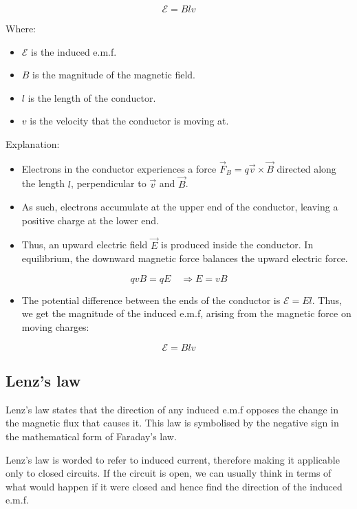 \documentclass[11pt]{article}
\begin{document}
\[\mathcal{E} = Blv\]

Where:
\begin{itemize}
\item \(\mathcal{E}\) is the induced e.m.f.
\item \(B\) is the magnitude of the magnetic field.
\item \(l\) is the length of the conductor.
\item \(v\) is the velocity that the conductor is moving at.
\end{itemize}
Explanation:
\begin{itemize}
\item Electrons in the conductor experiences a force \(\vec{F}_B = q \vec{v} \times \vec{B}\) directed along the length \(l\), perpendicular to \(\vec{v}\) and \(\vec{B}\).
\item As such, electrons accumulate at the upper end of the conductor, leaving a positive charge at the lower end.
\item Thus, an upward electric field \(\vec{E}\) is produced inside the conductor. In equilibrium, the downward magnetic force balances the upward electric force.
\end{itemize}
\[qvB = qE \quad \Rightarrow E = vB\]
\begin{itemize}
\item The potential difference between the ends of the conductor is \(\mathcal{E} = El\). Thus, we get the magnitude of the induced e.m.f, arising from the magnetic force on moving charges:
\end{itemize}
\[\mathcal{E} = Blv\]

\newpage
\subsection{Lenz's law}
\label{sec:org23fc8e2}
Lenz's law states that the direction of any induced e.m.f opposes the change in the magnetic flux that causes it. This law is symbolised by the negative sign in the mathematical form of Faraday's law.


Lenz's law is worded to refer to induced current, therefore making it applicable only to closed circuits. If the circuit is open, we can usually think in terms of what would happen if it were closed and hence find the direction of the induced e.m.f.
\end{document}
